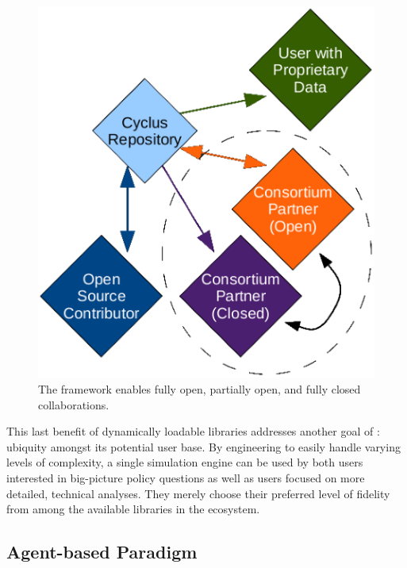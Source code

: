 \begin{figure}[htbp!]
\begin{center}
\includegraphics{./images/modifiedopen.eps}
\end{center}
\caption{The \Cyclus framework enables fully open, partially open, and fully
closed collaborations\cite{carlsen_cyclus_2014}.}
\label{fig:modifiedopen}
\end{figure}

This last benefit of dynamically loadable libraries addresses
another goal of \Cyclus: ubiquity amongst its potential user base. By
engineering \Cyclus to easily handle varying levels of complexity, a single
simulation engine can be used by both users interested in big-picture policy
questions as well as users focused on more detailed, technical
analyses. They merely choose their preferred level of fidelity from among the
available libraries in the ecosystem.

\subsection{Agent-based Paradigm}
\label{sec:abm}

